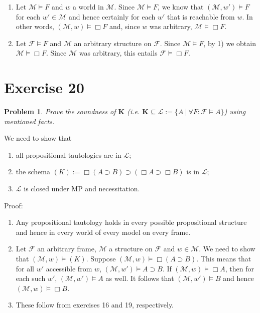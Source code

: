 \documentclass[a4paper,10pt]{article}
\newcommand{\imp}{\supset}
\newcommand{\K}{\textbf{K}}
\newcommand{\F}{\mathcal{F}}
\renewcommand{\L}{\mathcal{L}}
\newcommand{\M}{\mathcal{M}}
\newtheorem*{problem*}{Problem}
\theoremstyle{definition}
\begin{document}
\begin{enumerate}
 \item Let $\M \models F$ and $w$ a world in $\M$. Since $\M \models F$, we know that $(\M, w') \models F$ for each $w' \in \M$ and hence certainly for each $w'$ that is reachable from $w$. In other words, $(\M, w) \models \Box F$ and, since $w$ was arbitrary, $\M \models \Box F$.
 \item Let $\F \models F$ and $\M$ an arbitrary structure on $\F$. Since $\M \models F$, by 1) we obtain $\M \models \Box F$. Since $\M$ was arbitrary, this entails $\F \models \Box F$.
\end{enumerate}


\section{Exercise 20}
\begin{problem*}
 Prove the soundness of $\K$ (i.e. $\K \subseteq \L := \{A \ |\  \forall F: \F \models A\}$) using mentioned facts.
\end{problem*}

We need to show that
\begin{enumerate}
 \item all propositional tautologies are in $\L$;
 \item the schema $(K) := \Box(A \imp B) \imp (\Box A \imp \Box B)$ is in $\L$;
 \item $\L$ is closed under MP and necessitation.
\end{enumerate}

Proof:
\begin{enumerate}
 \item Any propositional tautology holds in every possible propositional structure and hence in every world of every model on every frame.
 \item Let $\F$ an arbitrary frame, $\M$ a structure on $\F$ and $w \in \M$. We need to show that $(\M, w) \models (K)$. Suppose $(\M, w) \models \Box(A\imp B)$. This means that for all $w'$ accessible from $w$, $(\M, w') \models A \imp B$. If $(\M, w) \models \Box A$, then for each such $w'$, $(\M, w') \models A$ as well. It follows that $(\M, w') \models B$ and hence $(\M, w) \models \Box B$.
 \item These follow from exercises 16 and 19, respectively.
\end{enumerate}
\end{document}
